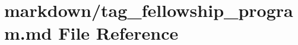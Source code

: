 \hypertarget{tag__fellowship__program_8md}{}\section{markdown/tag\+\_\+fellowship\+\_\+program.md File Reference}
\label{tag__fellowship__program_8md}
